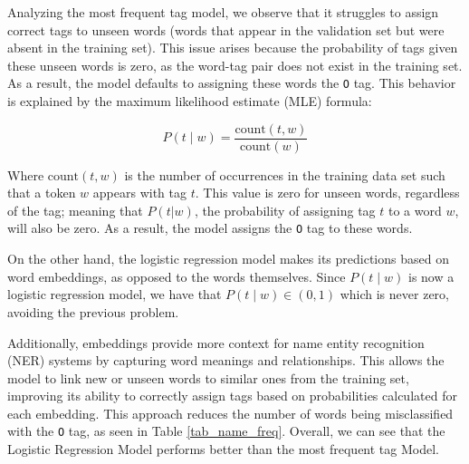 \documentclass[11pt,a4paper]{article}
\begin{document}
Analyzing the most frequent tag model, we observe that it struggles to assign correct tags to unseen words (words that appear in the validation set but were absent in the training set). This issue arises because the probability of tags given these unseen words is zero, as the word-tag pair does not exist in the training set. As a result, the model defaults to assigning these words the \texttt{O} tag. This behavior is explained by the maximum likelihood estimate (MLE) formula:

\[
P(t \mid w) = \frac{\text{count}(t, w)}{\text{count}(w)}
\]

Where $\text{count}(t, w)$ is the number of occurrences in the training data set such that a token $w$ appears with tag $t$. This value is zero for unseen words, regardless of the tag; meaning that $P(t|w)$, the probability of assigning tag $t$ to a word $w$, will also be zero. As a result, the model assigns the \texttt{O} tag to these words.



On the other hand, the logistic regression model makes its predictions based on word embeddings, as opposed to the words themselves. Since $P(t \mid w)$ is now a logistic regression model, we have that $P(t \mid w) \in (0,1)$ which is never zero, avoiding the previous problem.

Additionally, embeddings provide more context for name entity recognition (NER) systems by capturing word meanings and relationships. This allows the model to link new or unseen words to similar ones from the training set, improving its ability to correctly assign tags based on probabilities calculated for each embedding. This approach reduces the number of words being misclassified with the \texttt{O} tag, as seen in Table \ref{tab_name_freq}. Overall, we can see that the Logistic Regression Model performs better than the most frequent tag Model.

\end{document}
